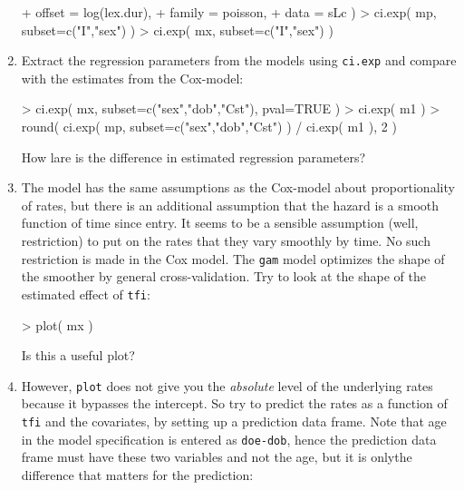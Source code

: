 \begin{enumerate}[resume]
\begin{Schunk}
\begin{Sinput}
+            offset = log(lex.dur),
+            family = poisson, 
+              data = sLc )
> ci.exp( mp, subset=c("I","sex") )
> ci.exp( mx, subset=c("I","sex") )
\end{Sinput}
\end{Schunk}
\item Extract the regression parameters from the models using
  \texttt{ci.exp} and compare with the estimates from the Cox-model:
\begin{Schunk}
\begin{Sinput}
> ci.exp( mx, subset=c("sex","dob","Cst"), pval=TRUE )
> ci.exp( m1 )
> round( ci.exp( mp, subset=c("sex","dob","Cst") ) / ci.exp( m1 ), 2 )
\end{Sinput}
\end{Schunk}
How lare is the difference in estimated regression parameters?
\item The model has the same assumptions as the Cox-model about
  proportionality of rates, but there is an additional assumption that
  the hazard is a smooth function of time since entry. It seems to be
  a sensible assumption (well, restriction) to put on the rates that
  they vary smoothly by time. No such restriction is made in the Cox
  model. The \texttt{gam} model optimizes the shape of the smoother by
  general cross-validation. Try to look at the shape of the
  estimated effect of \texttt{tfi}:
\begin{Schunk}
\begin{Sinput}
> plot( mx )
\end{Sinput}
\end{Schunk}
Is this a useful plot?
\item However, \texttt{plot} does not give you the \emph{absolute}
  level of the underlying rates because it bypasses the intercept. So
  try to predict the rates as a function of \texttt{tfi} and the
  covariates, by setting up a prediction data frame. Note that age
  in the model specification is entered as \texttt{doe-dob}, hence
  the prediction data frame must have these two variables and not
  the age, but it is onlythe difference that matters for the prediction:
\begin{Schunk}
\end{Schunk}
\end{enumerate}

